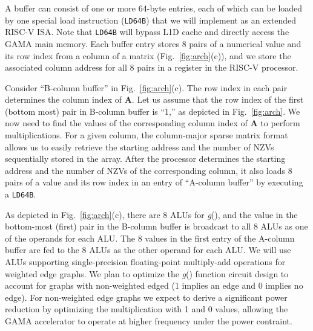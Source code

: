 A buffer can consist of one or more 64-byte entries, each of which can be loaded by one special load instruction (\texttt{LD64B}) that we will implement as an extended RISC-V ISA. 
Note that \texttt{LD64B} will bypass L1D cache and directly access the GAMA main memory.
Each buffer entry stores 8 pairs of a numerical value and its row index from a column of a matrix (Fig.~\ref{fig:arch}(c)), and
we store the associated column address for all 8 pairs in a register in the RISC-V processor.


Consider ``B-column buffer'' in Fig.~\ref{fig:arch}(c). 
The row index in each pair determines the column index of \textbf{A}. %
Let us assume that the row index of the first (bottom most) pair in B-column buffer is ``1,'' as depicted in Fig.~\ref{fig:arch}.
We now need to find the values of the corresponding column index of \textbf{A} to perform multiplications.  
For a given column, the column-major sparse matrix format allows us to easily retrieve the starting address and the number of NZVs sequentially stored in the array. 
After the processor determines the starting address and the number of NZVs of the corresponding column, 
it also loads 8 pairs of a value and its row index in an entry of ``A-column buffer'' by executing a \texttt{LD64B}.


As depicted in Fig.~\ref{fig:arch}(c), there are 8 ALUs for \textit{g}(), and the value in the bottom-most (first) pair in the B-column buffer 
is broadcast to all 8 ALUs as one of the operands for each ALU.
The 8 values in the first entry of the A-column buffer are fed to the 8 ALUs as the other operand for each ALU.
We will use ALUs supporting single-precision floating-point multiply-add operations for weighted edge graphs. 
We plan to optimize the \textit{g}() function circuit design to account for graphs with non-weighted edged (1 implies an edge and 0 implies no edge). 
For non-weighted edge graphs we expect to derive a significant power reduction by optimizing the multiplication with 1 and 0 values, 
allowing the GAMA accelerator to operate at higher frequency under the power contraint.     
 
